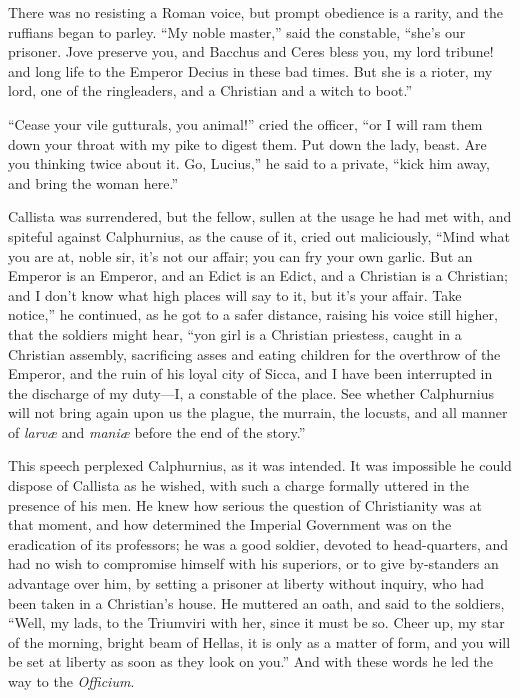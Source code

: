 There was no resisting a Roman voice, but prompt obedience is a
rarity, and the ruffians began to parley. ``My noble master,''
said the constable, ``she's our prisoner. Jove preserve you, and
Bacchus and Ceres bless you, my lord tribune! and long life to
the Emperor Decius in these bad times. But she is a rioter, my lord,
one of the ringleaders, and a Christian and a witch to boot.''

``Cease your vile gutturals, you animal!'' cried the
officer, ``or I will ram them down your throat with my pike to
digest them. Put down the lady, beast. Are you thinking twice about
it. Go, Lucius,'' he said to a private, ``kick him away, and
bring the woman here.''

Callista was surrendered, but the fellow, sullen at the usage he
had met with, and spiteful against Calphurnius, as the cause of it,
cried out maliciously, ``Mind what you are at, noble sir, it's not
our affair; you can fry your own garlic. But an Emperor is an Emperor,
and an Edict is an Edict, and a Christian is a Christian; and I don't
know what high places will say to it, but it's your affair. Take
notice,'' he continued, as he got to a safer distance, raising his
voice still higher, that the soldiers might hear, ``yon girl is a
Christian priestess, caught in a Christian assembly, sacrificing asses
and eating children for the overthrow of the Emperor, and the ruin of
his loyal city of Sicca, and I have been interrupted in the discharge
of my duty—I, a constable of the place. See whether Calphurnius will
not bring again upon us the plague, the murrain, the locusts, and all
manner of \emph{larvæ} and \emph{maniæ} before the end of the
story.''

This speech perplexed Calphurnius, as it was intended. It was
impossible he could dispose of Callista as he wished, with such
a charge formally uttered in the presence of his men. He knew how
serious the question of Christianity was at that moment, and how
determined the Imperial Government was on the eradication of its
professors; he was a good soldier, devoted to head-quarters, and had
no wish to compromise himself with his superiors, or to give
by-standers an advantage over him, by setting a prisoner at liberty
without inquiry, who had been taken in a Christian's house. He
muttered an oath, and said to the soldiers, ``Well, my lads, to
the Triumviri with her, since it must be so. Cheer up, my star of the
morning, bright beam of Hellas, it is only as a matter of form, and
you will be set at liberty as soon as they look on you.'' And with
these words he led the way to the \emph{Officium}.

